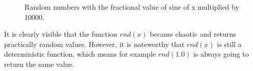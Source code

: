 \begin{figure}[H]
    \centering
    \caption{Random numbers with the fractional value of sine of x multiplied by 10000.}
\end{figure}

\noindent
It is clearly visible that the function $rnd(x)$ became chaotic and returns practically random values. However, it is noteworthy that $rnd(x)$ is still a deterministic function, which means for example $rnd(1.0)$ is always going to return the same value.